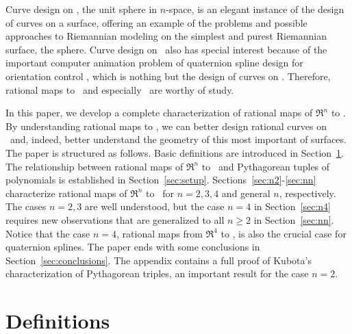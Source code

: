
Curve design on , the unit sphere in $n$-space,
is an elegant instance of the design of curves on a surface,
offering an example of the problems and possible approaches
to Riemannian modeling on the simplest and purest Riemannian surface, 
the sphere.
Curve design on \ also has special interest because
of the important computer animation problem of 
quaternion spline design for orientation control \cite{barr92,jj95,kim95},
which is nothing but the design of curves on .
Therefore, rational maps to \ and especially \ are worthy
of study.

In this paper, we develop a complete characterization of rational
maps of $\Re^{n}$ to .
By understanding rational maps to , we can better design rational
curves on \ and, indeed, better understand the geometry of this
most important of surfaces.
The paper is structured as follows.
Basic definitions are introduced in Section~\ref{sec:defn}.
The relationship between rational maps of $\Re^{n}$ to \
and Pythagorean tuples of polynomials is established in Section~\ref{sec:setup}.
Sections~\ref{sec:n2}-\ref{sec:nn} characterize rational maps 
of $\Re^{n}$ to \ for $n=2,3,4$ and general $n$, respectively.
The cases $n=2,3$ are well understood, but the case $n=4$ 
in Section~\ref{sec:n4} requires new observations 
that are generalized to all $n \geq 2$ in Section~\ref{sec:nn}.
Notice that the case $n=4$, rational maps from $\Re^4$ to \Sn{3},
is also the crucial case for quaternion splines.
The paper ends with some conclusions in Section~\ref{sec:conclusions}.
The appendix contains a full proof of Kubota's characterization of Pythagorean
triples, an important result for the case $n=2$.

\section{Definitions}
\label{sec:defn}

